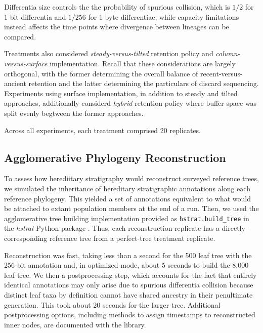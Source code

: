 Differentia size controls the the probability of spurious collision, which is $1/2$ for 1 bit differentia and $1/256$ for 1 byte differentiae, while capacity limitations instead affects the time points where divergence between lineages can be compared.

Treatments also considered \textit{steady-versus-tilted} retention policy and \textit{column-versus-surface} implementation.
Recall that these considerations are largely orthogonal, with the former determining the overall balance of recent-versus-ancient retention and the latter determining the particulars of discard sequencing.
Experiments using surface implementation, in addition to steady and tilted approaches, additionally considerd \textit{hybrid} retention policy where buffer space was split evenly begtween the former approaches.

Across all experiments, each treatment comprised 20 replicates.

\subsection{Agglomerative Phylogeny Reconstruction}

To assess how herediitary stratigraphy would reconstruct surveyed reference trees, we simulated the inheritance of hereditary stratigraphic annotations along each reference phylogeny.
This yielded a set of annotations equivalent to what would be attached to extant population members at the end of a run.
Then, we used the agglomerative tree building implementation provided as \texttt{hstrat.build\_tree} in the \textit{hstrat} Python package \citep{moreno2022hstrat}.
Thus, each reconstruction replicate has a directly-corresponding reference tree from a perfect-tree treatment replicate.

Reconstruction was fast, taking less than a second for the 500 leaf tree with the 256-bit annotation and,
in optimized mode, about 5 seconds to build the 8,000 leaf tree.
We then a postprocessing step,  which accounts for the fact that entirely identical annotations may only arise due to spurious differentia collision because distinct leaf taxa by definition cannot have shared ancestry in their penultimate generation.
This took about 20 seconds for the larger tree.
Additional postprocessing options, including methods to assign timestamps to reconstructed inner nodes, are documented with the library.

